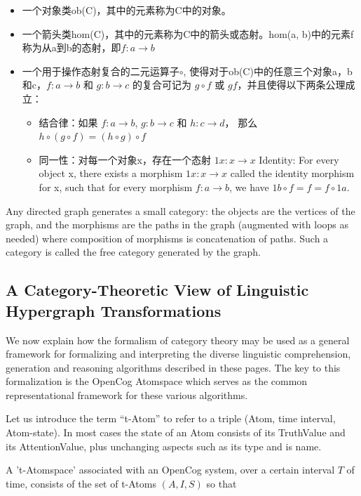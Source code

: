 \begin{itemize}
\item 一个对象类ob(C)，其中的元素称为C中的对象。
\item 一个箭头类hom(C)，其中的元素称为C中的箭头或态射。hom(a, b)中的元素f称为从a到b的态射，即$f : a \rightarrow b$
\item 一个用于操作态射复合的二元运算子$\circ$, 使得对于ob(C)中的任意三个对象a，b和c，$f : a \rightarrow b$ 和 $g : b \rightarrow c$ 的复合可记为 $g \circ f$ 或 $gf$，并且使得以下两条公理成立：

\begin{itemize}
\item 结合律：如果 $f : a \rightarrow b$, $g : b \rightarrow c$ 和 $h : c \rightarrow d$， 那么 $h \circ (g \circ f) = (h \circ g) \circ f$
\item 同一性：对每一个对象x，存在一个态射 $1x : x \rightarrow x$ 
Identity: For every object x, there exists a morphism $1x : x \rightarrow x$ called the identity morphism for x, such that for every morphism $f : a \rightarrow b$, we have $1b \circ f = f = f \circ 1a$.
\end{itemize}
\end{itemize}

Any directed graph generates a small category: the objects are the vertices of the graph, and the morphisms are the paths in the graph (augmented with loops as needed) where composition of morphisms is concatenation of paths. Such a category is called the free category generated by the graph.

\subsection{A Category-Theoretic View of Linguistic Hypergraph Transformations}

We now explain how the formalism of category theory may be used as a general framework for formalizing and interpreting the diverse linguistic comprehension, generation and reasoning algorithms described in these pages.   The key to this formalization is the OpenCog Atomspace which serves as the common representational framework for these various algorithms.

Let us introduce the term ``t-Atom'' to refer to a triple (Atom, time interval, Atom-state).   In most cases the state of an Atom consists of its TruthValue and its AttentionValue, plus unchanging aspects such as its type and is name.

A 't-Atomspace' associated with an OpenCog system, over a certain interval $T$ of time, consists of the set of t-Atoms $(A,I,S)$ so that

